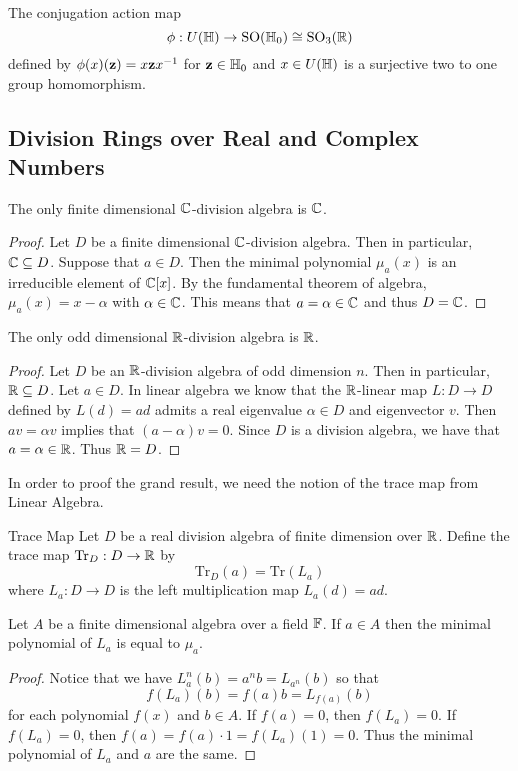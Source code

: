 \documentclass[a4paper]{article}
\begin{document}
\begin{thm}{}{} The conjugation action map $$\phi:U(\mathbb{H})\to\text{SO}(\mathbb{H}_0)\cong\text{SO}_3(\mathbb{R})$$ defined by $\phi(x)(\vb{z})=x\vb{z}x^{-1}$ for $\vb{z}\in\mathbb{H}_0$ and $x\in U(\mathbb{H})$ is a surjective two to one group homomorphism. 
\end{thm}

\subsection{Division Rings over Real and Complex Numbers}
\begin{prp}{}{} The only finite dimensional $\mathbb{C}$-division algebra is $\mathbb{C}$. \tcbline
\begin{proof}
Let $D$ be a finite dimensional $\mathbb{C}$-division algebra. Then in particular, $\mathbb{C}\subseteq D$. Suppose that $a\in D$. Then the minimal polynomial $\mu_a(x)$ is an irreducible element of $\mathbb{C}[x]$. By the fundamental theorem of algebra, $\mu_a(x)=x-\alpha$ with $\alpha\in\mathbb{C}$. This means that $a=\alpha\in\mathbb{C}$ and thus $D=\mathbb{C}$. 
\end{proof}
\end{prp}

\begin{prp}{}{} The only odd dimensional $\mathbb{R}$-division algebra is $\mathbb{R}$. \tcbline
\begin{proof}
Let $D$ be an $\mathbb{R}$-division algebra of odd dimension $n$. Then in particular, $\mathbb{R}\subseteq D$. Let $a\in D$. In linear algebra we know that the $\mathbb{R}$-linear map $L:D\to D$ defined by $L(d)=ad$ admits a real eigenvalue $\alpha\in D$ and eigenvector $v$. Then $av=\alpha v$ implies that $(a-\alpha)v=0$. Since $D$ is a division algebra, we have that $a=\alpha\in\mathbb{R}$. Thus $\mathbb{R}=D$. 
\end{proof}
\end{prp}

In order to proof the grand result, we need the notion of the trace map from Linear Algebra. 

\begin{defn}{Trace Map}{} Let $D$ be a real division algebra of finite dimension over $\mathbb{R}$. Define the trace map $\text{Tr}_D:D\to\mathbb{R}$ by $$\text{Tr}_D(a)=\text{Tr}(L_a)$$ where $L_a:D\to D$ is the left multiplication map $L_a(d)=ad$. 
\end{defn}

\begin{lmm}{}{} Let $A$ be a finite dimensional algebra over a field $\mathbb{F}$. If $a\in A$ then the minimal polynomial of $L_a$ is equal to $\mu_a$. \tcbline
\begin{proof}
Notice that we have $L_a^n(b)=a^nb=L_{a^n}(b)$ so that $$f(L_a)(b)=f(a)b=L_{f(a)}(b)$$ for each polynomial $f(x)$ and $b\in A$. If $f(a)=0$, then $f(L_a)=0$. If $f(L_a)=0$, then $f(a)=f(a)\cdot 1=f(L_a)(1)=0$. Thus the minimal polynomial of $L_a$ and $a$ are the same. 
\end{proof}
\end{lmm}
\end{document}
